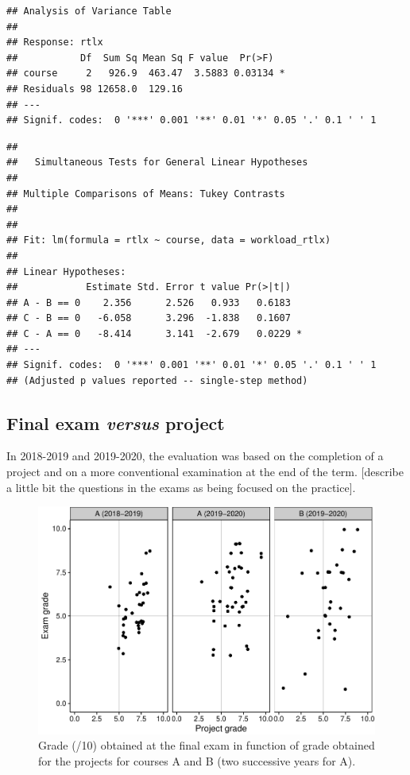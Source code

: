 \documentclass[
]{article}
\begin{document}
\begin{verbatim}
## Analysis of Variance Table
## 
## Response: rtlx
##           Df  Sum Sq Mean Sq F value  Pr(>F)  
## course     2   926.9  463.47  3.5883 0.03134 *
## Residuals 98 12658.0  129.16                  
## ---
## Signif. codes:  0 '***' 0.001 '**' 0.01 '*' 0.05 '.' 0.1 ' ' 1
\end{verbatim}

\begin{verbatim}
## 
##   Simultaneous Tests for General Linear Hypotheses
## 
## Multiple Comparisons of Means: Tukey Contrasts
## 
## 
## Fit: lm(formula = rtlx ~ course, data = workload_rtlx)
## 
## Linear Hypotheses:
##            Estimate Std. Error t value Pr(>|t|)  
## A - B == 0    2.356      2.526   0.933   0.6183  
## C - B == 0   -6.058      3.296  -1.838   0.1607  
## C - A == 0   -8.414      3.141  -2.679   0.0229 *
## ---
## Signif. codes:  0 '***' 0.001 '**' 0.01 '*' 0.05 '.' 0.1 ' ' 1
## (Adjusted p values reported -- single-step method)
\end{verbatim}

\hypertarget{final-exam-versus-project}{%
\subsection{\texorpdfstring{Final exam \emph{versus}
project}{Final exam versus project}}\label{final-exam-versus-project}}

In 2018-2019 and 2019-2020, the evaluation was based on the completion
of a project and on a more conventional examination at the end of the
term. {[}describe a little bit the questions in the exams as being
focused on the practice{]}.

\begin{figure}
\centering
\includegraphics{teaching_data_science_files/figure-latex/exams_projects-1.pdf}
\caption{Grade (/10) obtained at the final exam in function of grade
obtained for the projects for courses A and B (two successive years for
A).}
\end{figure}
\end{document}
